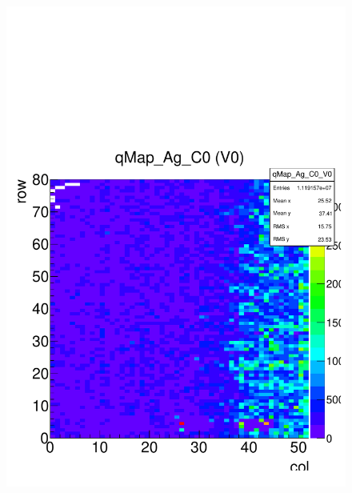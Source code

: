 \documentclass[a4paper,12pt,twoside]{article}
\begin{document}
\begin{figure} [h!] 
\centering
\begin{minipage}{.48\textwidth}
  \centering
  \includegraphics[width=\textwidth]{./Figures/HRData_qMap.pdf}
  \label{HRData-Qmap}
\end{minipage}%
\hspace{2mm}
\begin{minipage}{.48\textwidth}
  \centering

\end{minipage}
\end{figure}
\end{document}
